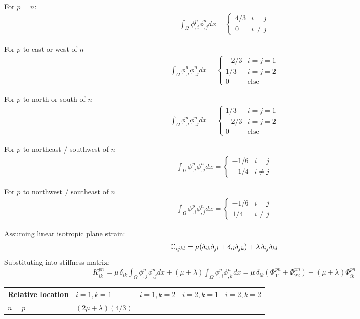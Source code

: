 \documentclass{article}
\begin{document}
For $p=n$:
\begin{align}
  \int_\Omega \phi_{,i}^p\phi^n_{,j}dx = 
  \begin{cases}
    4/3 & i=j\\
    0 & i\ne j
  \end{cases}
\end{align}

For $p$ to east or west of $n$
\begin{align}
  \int_\Omega \phi_{,i}^p\phi^n_{,j}dx = 
  \begin{cases}
    -2/3 & i=j=1\\
    1/3 & i=j=2\\
    0 & \text{else}
  \end{cases}
\end{align}

For $p$ to north or south of $n$
\begin{align}
  \int_\Omega \phi_{,i}^p\phi^n_{,j}dx = 
  \begin{cases}
    1/3 & i=j=1\\
    -2/3 & i=j=2\\
    0 & \text{else}
  \end{cases}
\end{align}

For $p$ to northeast / southwest of $n$
\begin{align}
  \int_\Omega \phi_{,i}^p\phi^n_{,j}dx = 
  \begin{cases}
    -1/6 & i=j\\
    -1/4 & i\ne j
  \end{cases}
\end{align}

For $p$ to northwest / southeast of $n$
\begin{align}
  \int_\Omega \phi_{,i}^p\phi^n_{,j}dx = 
  \begin{cases}
    -1/6 & i=j\\
    1/4 & i\ne j
  \end{cases}
\end{align}

Assuming linear isotropic plane strain:
\begin{align}
  \mathbb{C}_{ijkl}= \mu(\delta_{ik}\delta_{jl} +\delta_{il}\delta_{jk}) + \lambda\,\delta_{ij}\delta_{kl}
\end{align}
Substituting into stiffness matrix:
\begin{align}
  K^{pn}_{ik} = 
  \mu\,\delta_{ik}\int_\Omega \phi_{,j}^p\phi^n_{,j}dx + (\mu+\lambda)\int_\Omega \phi_{,i}^p\phi^n_{,k}dx 
  = \mu\,\delta_{ik}(\Phi^{pn}_{11}+\Phi^{pn}_{22}) + (\mu+\lambda)\Phi^{pn}_{ik}
\end{align}


\begin{tabularx}{1.0\linewidth}{XXXXX}
  \toprule
  Relative location & $i=1,k=1$ & $i=1,k=2$ & $i=2,k=1$ & $i=2,k=2$\\
  \midrule
  $n=p$ & $(2\mu+\lambda)(4/3)$ & 
\end{tabularx}
\end{document}
